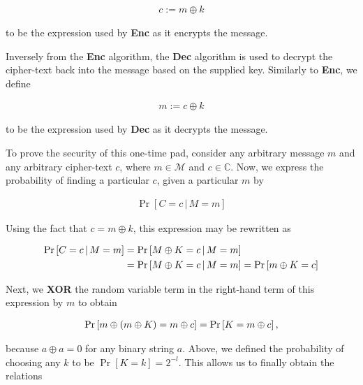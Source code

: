 \documentclass[../midterm.tex]{subfiles}
\begin{document}
\begin{flushleft}
\begin{align*}
c := m \oplus k
\end{align*}

to be the expression used by {\selectfont \textbf{Enc}} as it encrypts the message. \newline


Inversely from the {\selectfont \textbf{Enc}} algorithm, the {\selectfont \textbf{Dec}} algorithm is used to decrypt the cipher-text back into the message based on the supplied key.  Similarly to {\selectfont \textbf{Enc}}, we define

\begin{align*}
m := c \oplus k
\end{align*}

to be the expression used by {\selectfont \textbf{Dec}} as it decrypts the message. \newline

To prove the security of this one-time pad, consider any arbitrary message $m$ and any arbitrary cipher-text $c$, where $m \in \mathcal{M}$ and $c \in \mathbb{C}$. Now, we express the probability of finding a particular $c$, given a particular $m$ by

\begin{align}
\Pr \left[ C = c \, \vert \, M = m \right] \label{eq2}
\end{align}

Using the fact that $c = m \oplus k$, this expression may be rewritten as

\begin{align}
\Pr \left[ C = c \, \vert \, M = m \right] &= \Pr \left[ M \oplus K = c \, \vert \, M = m \right] \notag \\
&= \Pr \left[ M \oplus K = c \, \vert \, M = m \right] = \Pr \left[ m \oplus K = c \right] \notag
\end{align}

Next, we \textbf{XOR} the random variable term in the right-hand term of this expression by $m$ to obtain

\begin{align}
\Pr \left[ m \oplus \left( m \oplus K \right) = m \oplus c \right] = \Pr \left[ K = m \oplus c \right], \notag
\end{align}

because $a \oplus a = 0$ for any binary string $a$.  Above, we defined the probability of choosing any $k$ to be $\Pr \left[ K = k \right] = 2^{-l}$.  This allows us to finally obtain the relations


\end{flushleft}
\end{document}
